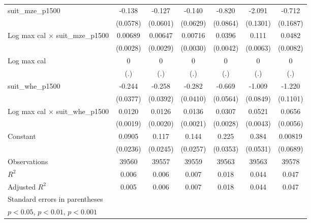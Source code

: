 {\begin{tabular}{l*{6}{c}}
suit\_mze\_p1500      &      -0.138\sym{*}  &      -0.127\sym{*}  &      -0.140\sym{*}  &      -0.820\sym{***}&      -2.091\sym{***}&      -0.712\sym{***}\\
                    &    (0.0578)         &    (0.0601)         &    (0.0629)         &    (0.0864)         &    (0.1301)         &    (0.1687)         \\
\addlinespace
Log max cal $\times$ suit\_mze\_p1500&     0.00689\sym{*}  &     0.00647\sym{*}  &     0.00716\sym{*}  &      0.0396\sym{***}&       0.111\sym{***}&      0.0482\sym{***}\\
                    &    (0.0028)         &    (0.0029)         &    (0.0030)         &    (0.0042)         &    (0.0063)         &    (0.0082)         \\
\addlinespace
Log max cal         &           0         &           0         &           0         &           0         &           0         &           0         \\
                    &         (.)         &         (.)         &         (.)         &         (.)         &         (.)         &         (.)         \\
\addlinespace
suit\_whe\_p1500      &      -0.244\sym{***}&      -0.258\sym{***}&      -0.282\sym{***}&      -0.669\sym{***}&      -1.009\sym{***}&      -1.220\sym{***}\\
                    &    (0.0377)         &    (0.0392)         &    (0.0410)         &    (0.0564)         &    (0.0849)         &    (0.1101)         \\
\addlinespace
Log max cal $\times$ suit\_whe\_p1500&      0.0120\sym{***}&      0.0126\sym{***}&      0.0136\sym{***}&      0.0307\sym{***}&      0.0521\sym{***}&      0.0656\sym{***}\\
                    &    (0.0019)         &    (0.0020)         &    (0.0021)         &    (0.0028)         &    (0.0043)         &    (0.0056)         \\
\addlinespace
Constant            &      0.0905\sym{***}&       0.117\sym{***}&       0.144\sym{***}&       0.225\sym{***}&       0.384\sym{***}&     0.00819         \\
                    &    (0.0236)         &    (0.0245)         &    (0.0257)         &    (0.0353)         &    (0.0531)         &    (0.0689)         \\
\midrule
Observations        &       39560         &       39557         &       39559         &       39563         &       39563         &       39578         \\
\(R^{2}\)           &       0.006         &       0.006         &       0.007         &       0.018         &       0.044         &       0.047         \\
Adjusted \(R^{2}\)  &       0.005         &       0.006         &       0.007         &       0.018         &       0.044         &       0.047         \\
\bottomrule
\multicolumn{7}{l}{\footnotesize Standard errors in parentheses}\\
\multicolumn{7}{l}{\footnotesize \sym{*} \(p<0.05\), \sym{**} \(p<0.01\), \sym{***} \(p<0.001\)}\\
\end{tabular}
}
